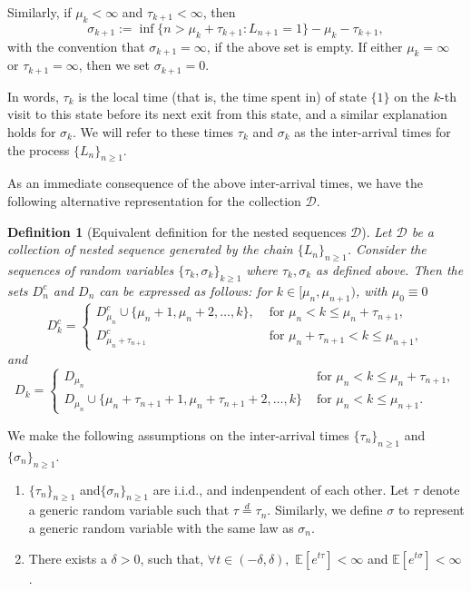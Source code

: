 \documentclass{article}
\numberwithin{equation}{section}
\newtheorem{defi}[theorem]{Definition}
\newcommand{\DD}{\mbox{${\mathcal D}$}}
\newcommand{\1}{\mathbf{1}}
\newcommand{\0}{\mathbf{0}}
\newcommand{\E}{\mbox{${\mathbb E}$}}
\begin{document}
Similarly, if  $\mu_k < \infty$ and $\tau_{k+1}< \infty$, then
\begin{equation}
\label{Eq: Def_sigma_k+1}
\sigma_{k+1} := \inf \{n > \mu_k+\tau_{k+1}: L_{n+1}=1\} -\mu_k-\tau_{k+1},  
\end{equation}
with the convention that $\sigma_{k+1}= \infty$, if the above set is empty. If either $\mu_k= \infty$ or $\tau_{k+1}= \infty$, then we set $\sigma_{k+1} =0$.

In words, $\tau_k$ is the local time (that is, the time spent in) of state $\{1\}$ on the $k$-th visit to this state before its next exit from this state, and a similar explanation holds for $\sigma_k$. We will refer to these times $\tau_k$ and $\sigma_k$ as the inter-arrival times for the process $\{L_n\}_{n \ge 1}$.



As an immediate consequence of the above inter-arrival times, we have the following alternative representation for the collection $\DD$.
\begin{defi}[Equivalent definition for the nested sequences $\mathcal{D}$]
\label{Def: Alt_def_DD}Let $\mathcal{D}$ be a collection of nested sequence generated by the chain $\{L_n\}_{n \ge 1}$. Consider the sequences of random variables $\{ \tau_k, \sigma_k \}_{k \geq 1}$ where $\tau_k, \sigma_k$ as defined above. Then the sets $D_n^c$ and $D_n$ can be expressed as follows:  
for $k \in [\mu_n, \mu_{n+1})$, with $\mu_0 \equiv 0$
\[ D^c_k = \begin{cases}

    D^c_{\mu_n} \cup \{ \mu_n + 1, \mu_n + 2, \ldots, k \},  & \text{ for } \mu_n < k \leq \mu_n+\tau_{n+1}, \\ 
    D^c_{\mu_n+ \tau_{n+1}} & \text{ for } \mu_n + \tau_{n+1} < k \leq     \mu_{n+1},
\end{cases}\]
and 
\[
D_k = \begin{cases}
    D_{\mu_n} & \text{ for } \mu_n < k \le \mu_n+\tau_{n+1}, \\
    D_{\mu_n} \cup \{ \mu_n + \tau_{n+1}+1, \mu_n + \tau_{n+1}+2, \ldots, k \} & \text{ for } \mu_n < k \leq \mu_{n+1}.
\end{cases}
\]
\end{defi}
We make the following assumptions on the inter-arrival times $\{\tau_n\}_{n \ge 1}$ and $\{\sigma_n\}_{n \ge 1}$. 
\begin{enumerate}
\item[(\textbf{A1})] $\{ \tau_n \}_{n \geq 1}$ and$\{ \sigma_n \}_{n \geq 1}$ are i.i.d., and indenpendent of each other. Let $\tau$ denote a generic random variable such that $\tau \stackrel{d}{=} \tau_n$. Similarly, we define $\sigma$ to represent a generic random variable with the same law as $\sigma_n$.   
\item[(\textbf{A2})] There exists a $\delta>0$, such that, $\forall t \in (-\delta,\delta), $ $ \E[e^{t\tau}] < \infty$ and $\E[e^{t\sigma}] < \infty$.
\end{enumerate}
\end{document}
